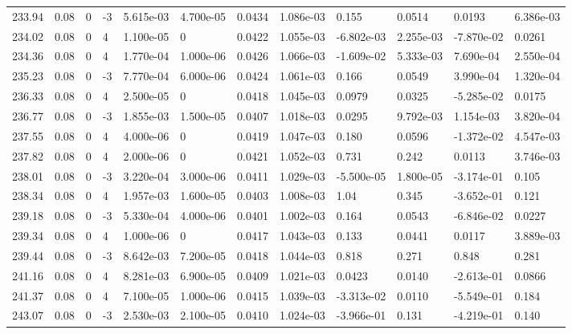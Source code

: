 \documentclass[preview]{standalone}
\begin{document}
{{{{{{{{{{{{\begin{tabular}{L{1.2cm}C{1.2cm} C{0.3cm}C{0.5cm} C{1.4cm}C{1.4cm} C{1.4cm}C{1.4cm} C{1.6cm}C{1.6cm} C{1.6cm}C{1.6cm}}
  233.94  &  0.08  & 0     & -3 &  5.615e-03  & 4.700e-05  &  0.0434&   1.086e-03& 0.155 & 0.0514   &  0.0193 & 6.386e-03  \\ 
  234.02  &  0.08  & 0     &  4 &  1.100e-05  & 0  &  0.0422&   1.055e-03& -6.802e-03 & 2.255e-03   &  -7.870e-02 & 0.0261  \\ 
  234.36  &  0.08  & 0     &  4 &  1.770e-04  & 1.000e-06  &  0.0426&   1.066e-03& -1.609e-02 & 5.333e-03   &  7.690e-04 & 2.550e-04  \\ 
  235.23  &  0.08  & 0     & -3 &  7.770e-04  & 6.000e-06  &  0.0424&   1.061e-03& 0.166 & 0.0549   &  3.990e-04 & 1.320e-04  \\ 
  236.33  &  0.08  & 0     &  4 &  2.500e-05  & 0  &  0.0418&   1.045e-03& 0.0979 & 0.0325   &  -5.285e-02 & 0.0175  \\ 
  236.77  &  0.08  & 0     & -3 &  1.855e-03  & 1.500e-05  &  0.0407&   1.018e-03& 0.0295 & 9.792e-03   &  1.154e-03 & 3.820e-04  \\ 
  237.55  &  0.08  & 0     &  4 &  4.000e-06  & 0  &  0.0419&   1.047e-03& 0.180 & 0.0596   &  -1.372e-02 & 4.547e-03  \\ 
  237.82  &  0.08  & 0     &  4 &  2.000e-06  & 0  &  0.0421&   1.052e-03& 0.731 & 0.242   &  0.0113 & 3.746e-03  \\ 
  238.01  &  0.08  & 0     & -3 &  3.220e-04  & 3.000e-06  &  0.0411&   1.029e-03& -5.500e-05 & 1.800e-05   &  -3.174e-01 & 0.105  \\ 
  238.34  &  0.08  & 0     &  4 &  1.957e-03  & 1.600e-05  &  0.0403&   1.008e-03& 1.04 & 0.345   &  -3.652e-01 & 0.121  \\ 
  239.18  &  0.08  & 0     & -3 &  5.330e-04  & 4.000e-06  &  0.0401&   1.002e-03& 0.164 & 0.0543   &  -6.846e-02 & 0.0227  \\ 
  239.34  &  0.08  & 0     &  4 &  1.000e-06  & 0  &  0.0417&   1.043e-03& 0.133 & 0.0441   &  0.0117 & 3.889e-03  \\ 
  239.44  &  0.08  & 0     & -3 &  8.642e-03  & 7.200e-05  &  0.0418&   1.044e-03& 0.818 & 0.271   &  0.848 & 0.281  \\ 
  241.16  &  0.08  & 0     &  4 &  8.281e-03  & 6.900e-05  &  0.0409&   1.021e-03& 0.0423 & 0.0140   &  -2.613e-01 & 0.0866  \\ 
  241.37  &  0.08  & 0     &  4 &  7.100e-05  & 1.000e-06  &  0.0415&   1.039e-03& -3.313e-02 & 0.0110   &  -5.549e-01 & 0.184  \\ 
  243.07  &  0.08  & 0     & -3 &  2.530e-03  & 2.100e-05  &  0.0410&   1.024e-03& -3.966e-01 & 0.131   &  -4.219e-01 & 0.140  \\ 

\end{tabular}}}}}}}}}}}}}
\end{document}
